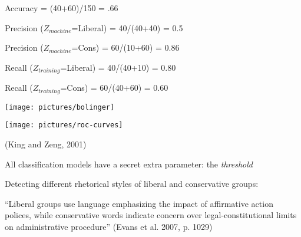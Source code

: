 \documentclass{mediumfoils}
\begin{document}
\begin{center}
\end{center}

\vspace*{0.5cm}

Accuracy = (40+60)/150 = .66

Precision ($Z_{machine}$=Liberal) = 40/(40+40) = 0.5

Precision ($Z_{machine}$=Cons) = 60/(10+60) = 0.86

Recall ($Z_{training}$=Liberal) = 40/(40+10) = 0.80

Recall ($Z_{training}$=Cons) = 60/(40+60) = 0.60

\newpage

\centerline{\texttt{[image: pictures/bolinger]}}



\centerline{\texttt{[image: pictures/roc-curves]}}

(King and Zeng, 2001)


All classification models have a secret extra parameter: the \textit{threshold}


Detecting different rhetorical styles of liberal and conservative groups:

``Liberal groups use language emphasizing the impact of affirmative action polices, while conservative words indicate concern over legal-constitutional limits on administrative procedure'' (Evans et al. 2007, p. 1029)

\newpage
\end{document}
